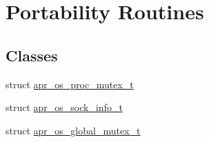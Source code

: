 \hypertarget{group__apr__portabile}{}\section{Portability Routines}
\label{group__apr__portabile}
\subsection*{Classes}
\begin{DoxyCompactItemize}
\item 
struct \mbox{\hyperlink{structapr__os__proc__mutex__t}{apr\+\_\+os\+\_\+proc\+\_\+mutex\+\_\+t}}
\item 
struct \mbox{\hyperlink{structapr__os__sock__info__t}{apr\+\_\+os\+\_\+sock\+\_\+info\+\_\+t}}
\item 
struct \mbox{\hyperlink{structapr__os__global__mutex__t}{apr\+\_\+os\+\_\+global\+\_\+mutex\+\_\+t}}
\end{DoxyCompactItemize}
